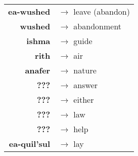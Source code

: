 \begin{tabular}{rl}
\textbf{ea-wushed} & $\rightarrow$ leave (abandon) \\
\textbf{wushed} & $\rightarrow$ abandonment \\
\textbf{ishma} & $\rightarrow$ guide \\
\textbf{rith} & $\rightarrow$ air \\
\textbf{anafer} & $\rightarrow$ nature \\
\textbf{???} & $\rightarrow$ answer \\
\textbf{???} & $\rightarrow$ either \\
\textbf{???} & $\rightarrow$ law \\
\textbf{???} & $\rightarrow$ help \\
\textbf{ea-quil'sul} & $\rightarrow$ lay \\
\end{tabular}


